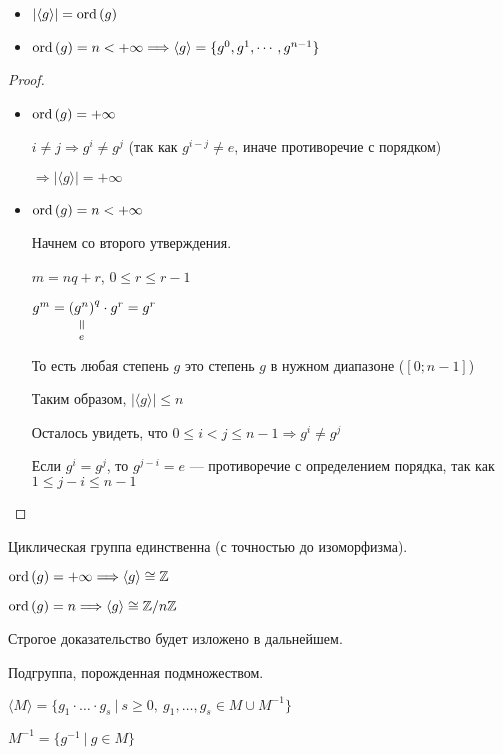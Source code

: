 \begin{theorem}

  \begin{itemize}
  \item $|\langle g \rangle| = \operatorname{ord}\left( g \right)$
  \item $\operatorname{ord}\left( g \right) = n < +\infty \Longrightarrow \langle g \rangle = \{ g^0, g^1, \cdots, g^{n-1} \}$
  \end{itemize}

\begin{proof}
  \begin{itemize}
    \item $\operatorname{ord}\left( g \right) = +\infty$

    $i \neq j \Longrightarrow g^i \neq g^j$ (так как $g^{i-j} \neq e$, иначе противоречие с порядком)

    $\Longrightarrow |\langle g \rangle| = +\infty$
    
    \item $\operatorname{ord}\left( g \right) = n < +\infty$
    
    Начнем со второго утверждения. 
    
    $m = nq + r$, $0 \leq r \leq r - 1$
    
    $g^m = \equalto{(g^n)}{e}^q \cdot g^r = g^r$

    То есть любая степень $g$ это степень $g$ в нужном диапазоне ($[0; n-1]$)

    Таким образом, $|\langle g \rangle| \leq n$

    Осталось увидеть, что $0 \leq i < j \leq n - 1 \Longrightarrow g^i\neq g^j $

    Если $g^i = g^j$, то $g^{j-i} = e$ --- противоречие с определением порядка, так как $1 \leq j - i \leq n - 1$
  \end{itemize}
\end{proof}
\end{theorem}

\notice Циклическая группа единственна (с точностью до изоморфизма).

$\operatorname{ord}\left( g \right) = +\infty \Longrightarrow \langle g \rangle \cong \mathbb{Z}$

$\operatorname{ord}\left( g \right) = n \Longrightarrow \langle g \rangle \cong \mathbb{Z}/n \mathbb{Z}$

Строгое доказательство будет изложено в дальнейшем.

\begin{conj}
  Подгруппа, порожденная подмножеством.

  $\langle M \rangle = \{ g_1 \cdot \ldots \cdot g_s\ |\ s \geq 0,\ g_1, \ldots, g_s \in M \cup M^{-1} \}$

  $M^{-1} = \{ g^{-1}\ |\ g\in M \}$
  
\end{conj}


